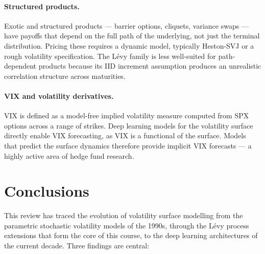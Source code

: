\documentclass[12pt, a4paper]{article}
\begin{document}
\paragraph{Structured products.}
Exotic and structured products --- barrier options, cliquets, variance
swaps --- have payoffs that depend on the full path of the underlying,
not just the terminal distribution. Pricing these requires a dynamic
model, typically Heston-SVJ or a rough volatility specification. The
L\'{e}vy family is less well-suited for path-dependent products
because its IID increment assumption produces an unrealistic
correlation structure across maturities.

\paragraph{VIX and volatility derivatives.}
VIX is defined as a model-free implied volatility measure computed from
SPX options across a range of strikes. Deep learning models for the
volatility surface directly enable VIX forecasting, as VIX is a
functional of the surface. Models that predict the surface dynamics
therefore provide implicit VIX forecasts --- a highly active area of
hedge fund research.

\section{Conclusions}

This review has traced the evolution of volatility surface modelling
from the parametric stochastic volatility models of the 1990s, through
the L\'{e}vy process extensions that form the core of this course, to
the deep learning architectures of the current decade. Three findings
are central:
\end{document}
